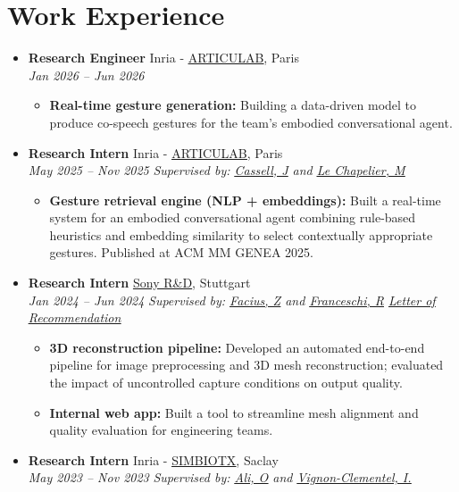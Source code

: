 \documentclass[letterpaper,11pt,twocolumn]{article}
\newcommand{\resumeItem}[1]{\item \small{#1}}
\newcommand{\resumeSubheading}[4]{
	\vspace{-2pt}\item \textbf{#1} \hfill #2 \\
	\textit{\small #3} \hfill \textit{\small #4} 
	\vspace{-7pt}
}
\newcommand{\resumeItemListStart}{\begin{itemize}[leftmargin=*]}
\newcommand{\resumeItemListEnd}{\end{itemize}\vspace{-5pt}}
\begin{document}
	\section{Work Experience}
	\begin{itemize}[leftmargin=*]
        \resumeSubheading
    		{Research Engineer}{Inria - \href{https://articulab.hcii.cs.cmu.edu/}{\underline{ARTICULAB}}, Paris}{Jan 2026 -- Jun 2026}{}
        \resumeItemListStart
    	\resumeItem{\textbf{Real-time gesture generation:} Building a data-driven model to produce co-speech gestures for the team's embodied conversational agent.}
    	\resumeItemListEnd

		\resumeSubheading
		{Research Intern}{Inria - \href{https://articulab.hcii.cs.cmu.edu/}{\underline{ARTICULAB}}, Paris}{May 2025 -- Nov 2025}{\textit{Supervised by: \href{https://scholar.google.com/citations?user=wkC9xHMAAAAJ&hl=en}{\underline{Cassell, J}} and \href{https://fr.linkedin.com/in/marius-le-chapelier-7694b5172}{\underline{Le Chapelier, M}}}} 
	
	\resumeItemListStart
	\resumeItem{\textbf{Gesture retrieval engine (NLP + embeddings):} Built a real-time system for an embodied conversational agent combining rule-based heuristics and embedding similarity to select contextually appropriate gestures. Published at ACM MM GENEA 2025.}
	\resumeItemListEnd
	
	\resumeSubheading
	{Research Intern}{\href{https://www.sony.com/en/SonyInfo/research/about/stuttgart-laboratory1/}{\underline{Sony R\&D}}, Stuttgart}{Jan 2024 -- Jun 2024}{\textit{Supervised by: \href{https://de.linkedin.com/in/zoltan-facius-6b424112}{\underline{Facius, Z}} and \href{https://de.linkedin.com/in/roberto-franceschi}{\underline{Franceschi, R}}} \vspace{5pt} \href{https://machtayassine.github.io/resume/Sony_LoR.pdf}{\underline{\textit{Letter of Recommendation}}}}
	
	\resumeItemListStart
	\resumeItem{\textbf{3D reconstruction pipeline:} Developed an automated end-to-end pipeline for image preprocessing and 3D mesh reconstruction; evaluated the impact of uncontrolled capture conditions on output quality.}
	\resumeItem{\textbf{Internal web app:} Built a tool to streamline mesh alignment and quality evaluation for engineering teams.}
	\resumeItemListEnd
	
	\resumeSubheading
	{Research Intern}{Inria - \href{https://team.inria.fr/simbiotx/}{\underline{SIMBIOTX}}, Saclay}{May 2023 -- Nov 2023}{\textit{Supervised by: \href{https://scholar.google.com/citations?user=tKRo0ewAAAAJ&hl=en}{\underline{Ali, O}} and \href{https://team.inria.fr/simbiotx/team-members/irene-vignon-clementel/}{\underline{Vignon-Clementel, I.}}}}
	

\end{itemize}
\end{document}
